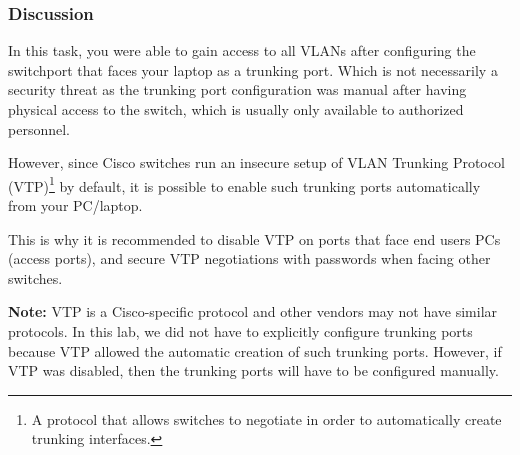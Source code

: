 \documentclass[pdftex,12pt,a4paper]{article}
\begin{document}
            \subsubsection{Discussion}
                In this task, you were able to gain access to all VLANs after
                configuring the switchport that faces your laptop as a trunking
                port. Which is not necessarily a security threat as the trunking port
                configuration was manual after having physical access to the
                switch, which is usually only available to authorized personnel.

                However, since Cisco switches run an insecure setup of VLAN
                Trunking Protocol (VTP)\footnote{A protocol that allows
                switches to negotiate in order to automatically create
                trunking interfaces.} by default, it is possible to enable such
                trunking ports automatically from your PC/laptop.

                This is why it is recommended to disable VTP on ports that face end
                users PCs (access ports), and secure VTP negotiations with
                passwords when facing other switches.

                \textbf{Note:} VTP is a Cisco-specific protocol and other vendors
                may not have similar protocols. In this lab, we did not have to
                explicitly configure trunking ports because VTP allowed the
                automatic creation of such trunking ports. However, if VTP was
                disabled, then the trunking ports will have to be configured
                manually.
\end{document}
